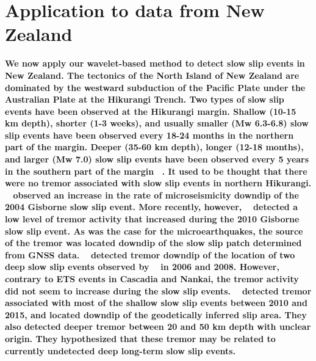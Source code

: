 \documentclass{article}
\begin{document}
\section{Application to data from New Zealand}

\textbf{We now apply our wavelet-based method to detect slow slip events in New Zealand. The tectonics of the North Island of New Zealand are dominated by the westward subduction of the Pacific Plate under the Australian Plate at the Hikurangi Trench. Two types of slow slip events have been observed at the Hikurangi margin. Shallow (10-15 km depth), shorter (1-3 weeks), and usually smaller (Mw 6.3-6.8) slow slip events have been observed every 18-24 months in the northern part of the margin. Deeper (35-60 km depth), longer (12-18 months), and larger (Mw 7.0) slow slip events have been observed every 5 years in the southern part of the
margin ~\citep{WAL_2010,TOD_2016}. It used to be thought that there were no tremor associated with slow slip events in northern Hikurangi. ~\citet{DEL_2009} observed an increase in the rate of microseismicity downdip
of the 2004 Gisborne slow slip event. More recently, however, ~\citep{KIM_2011} detected a low level of tremor activity that increased during the 2010 Gisborne slow slip event. As was the case for the microearthquakes, the source of the tremor was located downdip of the slow slip patch determined from GNSS data. ~\citep{IDE_2012} detected tremor downdip of the location of two deep slow slip events observed by ~\citet{WAL_2013} in 2006 and 2008. However, contrary to ETS events in Cascadia and Nankai, the tremor activity did not seem to increase during the slow slip events. ~\citet{TOD_2016}  detected tremor associated with most of the shallow slow slip events between 2010 and 2015, and located downdip of the geodetically inferred slip area. They also detected deeper tremor between 20 and 50 km depth with unclear origin. They hypothesized that these tremor may be related to currently undetected deep long-term slow slip events.} \\
\end{document}
